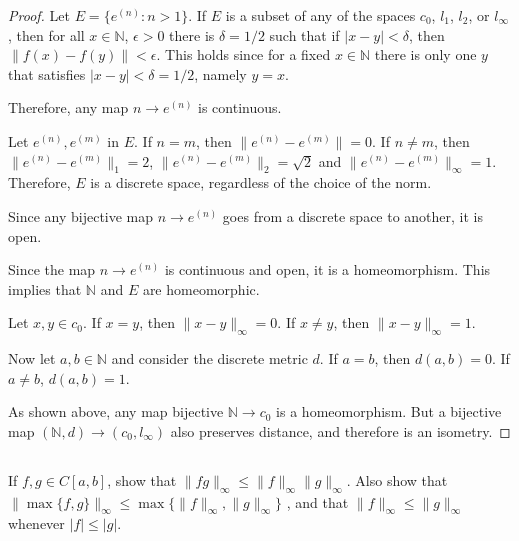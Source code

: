\begin{proof}
Let $E = \{e^{(n)} : n > 1\}$. If $E$ is a subset of any of the spaces $c_0$, $l_1$, $l_2$, or $l_\infty$, then for all $x\in \mathbb{N}$, $\epsilon > 0$ there is $\delta = 1/2$ such that if $|x-y| < \delta$, then $\|f(x) - f(y)\|<\epsilon$. This holds since for a fixed $x\in \mathbb{N}$ there is only one $y$ that satisfies $|x-y| < \delta = 1/2$, namely $y = x$.

Therefore, any map $n \rightarrow e^{(n)}$ is continuous.

\vspace{1em}

Let $e^{(n)}, e^{(m)}$ in $E$. If $n = m$, then $\|e^{(n)} - e^{(m)}\| = 0$. If $n \neq m$, then $\|e^{(n)} - e^{(m)}\|_1 = 2$, $\|e^{(n)} - e^{(m)}\|_2 = \sqrt{2}$ and $\|e^{(n)} - e^{(m)}\|_\infty = 1$. Therefore, $E$ is a discrete space, regardless of the choice of the norm.

Since any bijective map $n \rightarrow e^{(n)}$ goes from a discrete space to another, it is open.

Since the map $n \rightarrow e^{(n)}$ is continuous and open, it is a homeomorphism. This implies that $\mathbb{N}$ and $E$ are homeomorphic.

\vspace{}

Let $x,y \in c_0$. If $x = y$, then $\|x - y\|_\infty = 0$. If $x \neq y$, then $\|x - y\|_\infty = 1$.

Now let $a,b \in \mathbb{N}$ and consider the discrete metric $d$. If $a=b$, then $d(a,b) = 0$. If $a \neq b$, $d(a,b) = 1$.

As shown above, any map bijective $\mathbb{N} \rightarrow c_0$ is a homeomorphism. But a bijective map $(\mathbb{N}, d) \rightarrow (c_0, l_\infty)$ also preserves distance, and therefore is an isometry.

\end{proof}


\subsection{} If $f,g \in C[a,b]$, show that $\|fg\|_\infty \leq \|f\|_\infty \|g\|_\infty$. Also show that $\| \max\{f, g\} \|_\infty \leq \max \{ \| f \|_\infty, \| g \|_\infty \}$ , and that $\| f \|_\infty \leq \| g \|_\infty$ whenever $ |f| \leq  |g|$.

